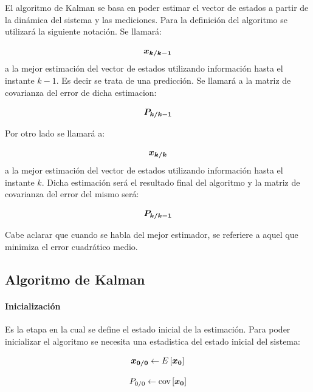 
	El algoritmo de Kalman se basa en poder estimar el vector de estados a partir de la dinámica del sistema y las mediciones. Para la definición del algoritmo se utilizará la siguiente notación. Se llamará:
	
	\begin{equation*}
		\boldsymbol{x_{k/k - 1}}
	\end{equation*}
	a la mejor estimación del vector de estados utilizando información hasta el instante $k - 1$. Es decir se trata de una predicción. Se llamará a la matriz de covarianza del error de dicha estimacion:
	
	\begin{equation*}
		\boldsymbol{P_{k/k - 1}}
	\end{equation*}
	
	Por otro lado se llamará a:
	
	\begin{equation*}
		\boldsymbol{x_{k/k}}
	\end{equation*}
	a la mejor estimación del vector de estados utilizando información hasta el instante $k$. Dicha estimación será el resultado final del algoritmo y la matriz de covarianza del error del mismo será:
	
	\begin{equation*}
		\boldsymbol{P_{k/k - 1}}
	\end{equation*}

	Cabe aclarar que cuando se habla del mejor estimador, se referiere a aquel que minimiza el error cuadrático medio.\\
	
		\subsection{Algoritmo de Kalman}
			\paragraph{Inicialización}
				Es la etapa en la cual se define el estado inicial de la estimación. Para poder inicializar el algoritmo se necesita una estadistica del estado inicial del sistema:
				
				\begin{equation*}
					\boldsymbol{x_{0/0}} \leftarrow E\left[\boldsymbol{x_{0}}\right]
				\end{equation*}
				
				\begin{equation*}
					P_{0/0} \leftarrow \text{cov}\left[\boldsymbol{x_{0}}\right]
				\end{equation*}
